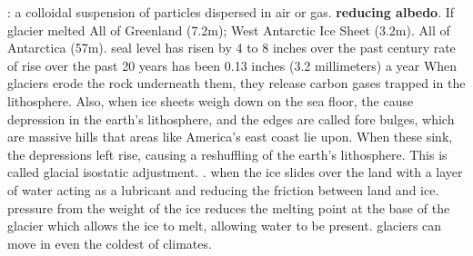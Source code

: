 	\ddd {}: a colloidal suspension of particles dispersed in air or gas.
	\textbf{reducing albedo}.
	 If glacier melted 
	 All of Greenland (7.2m); West Antarctic Ice Sheet (3.2m). All of Antarctica (57m). 
	\ddd seal level has risen by 4 to 8 inches over the past century
	\ddd rate of rise over the past 20 years has been 0.13 inches (3.2 millimeters) a year
	 When glaciers erode the rock underneath them, they release carbon gases trapped in the lithosphere. Also, when ice sheets weigh down on the sea floor, the cause depression in the earth's lithosphere, and the edges are called fore bulges, which are massive hills that areas like America's east coast lie upon. When these sink, the depressions left rise, causing a reshuffling of the earth's lithosphere. This is called glacial isostatic adjustment.
	. when the ice slides over the land with a layer of water acting as a lubricant and reducing the friction between land and ice. pressure from the weight of the ice reduces the melting point at the base of the glacier which allows the ice to melt, allowing water to be present.  glaciers can move in even the coldest of climates.